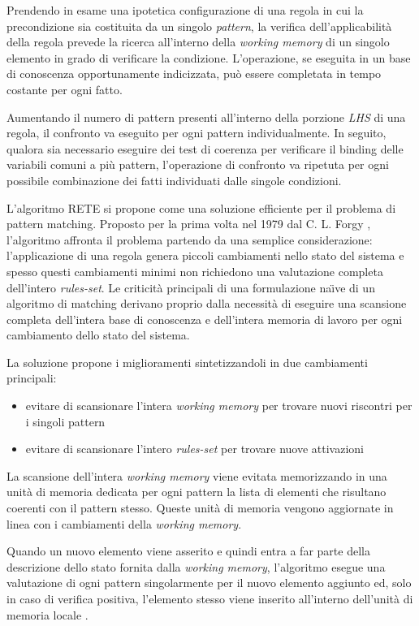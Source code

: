 Prendendo in esame una ipotetica configurazione di una regola in cui la precondizione sia costituita da un singolo \emph{pattern}, la verifica dell'applicabilità della regola prevede la ricerca all'interno della \emph{working memory} di un singolo elemento in grado di verificare la condizione. L'operazione, se eseguita in un base di conoscenza opportunamente indicizzata, può essere completata in tempo costante per ogni fatto. \cite{russellnorvig2009}

Aumentando il numero di pattern presenti all'interno della porzione \emph{LHS} di una regola, il confronto va eseguito per ogni pattern individualmente. In seguito, qualora sia necessario eseguire dei test di coerenza per verificare il binding delle variabili comuni a più pattern, l'operazione di confronto va ripetuta per ogni possibile combinazione dei fatti individuati dalle singole condizioni.

L'algoritmo RETE si propone come una soluzione efficiente per il problema di pattern matching. Proposto per la prima volta nel 1979 dal C. L. Forgy \cite{forgy1979} \cite{forgy1982}, l'algoritmo affronta il problema partendo da una semplice considerazione: l'applicazione di una regola genera piccoli cambiamenti nello stato del sistema e spesso questi cambiamenti minimi non richiedono una valutazione completa dell'intero \emph{rules-set}. Le criticità principali di una formulazione na\"{\i}ve di un algoritmo di matching derivano proprio dalla necessità di eseguire una scansione completa dell'intera base di conoscenza e dell'intera memoria di lavoro per ogni cambiamento dello stato del sistema.

La soluzione propone i miglioramenti sintetizzandoli in due cambiamenti principali:
\begin{itemize}
	\item evitare di scansionare l'intera \emph{working memory} per trovare nuovi riscontri per i singoli pattern
	\item evitare di scansionare l'intero \emph{rules-set} per trovare nuove attivazioni
\end{itemize}

La scansione dell'intera \emph{working memory} viene evitata memorizzando in una unità di memoria dedicata per ogni pattern la lista di elementi che risultano coerenti con il pattern stesso. Queste unità di memoria vengono aggiornate in linea con i cambiamenti della \emph{working memory}.

Quando un nuovo elemento viene asserito e quindi entra a far parte della descrizione dello stato fornita dalla \emph{working memory}, l'algoritmo esegue una valutazione di ogni pattern singolarmente per il nuovo elemento aggiunto ed, solo in caso di verifica positiva, l'elemento stesso viene inserito all'interno dell'unità di memoria locale \cite{forgy1982}.

